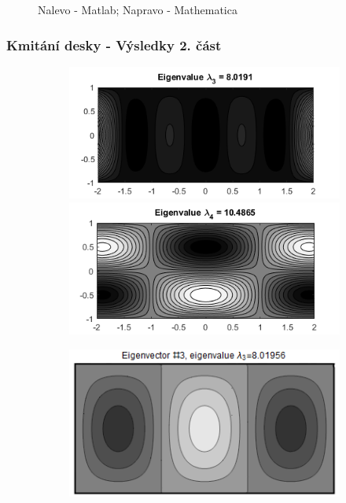 \documentclass[xcolor=table]{beamer}
\begin{document}
\begin{frame}
\begin{figure}
\begin{subfigure}{.5\textwidth}
\end{subfigure}
\caption{Nalevo - Matlab; Napravo - Mathematica}
\end{figure}
\end{frame}


\begin{frame}
\frametitle{Kmitání desky - Výsledky 2. část}

\begin{figure}
\centering
\begin{subfigure}{.5\textwidth}
\centering
\includegraphics[width=1\linewidth]{obdelnicky21.png}
\includegraphics[width=1\linewidth]{obdelnicky22.png}
\end{subfigure}%
\begin{subfigure}{.5\textwidth}
\centering
\includegraphics[width=.95\linewidth]{rectangle-eigenvector-3.png}

\end{subfigure}
\end{figure}
\end{frame}
\end{document}
